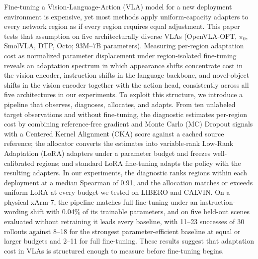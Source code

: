 Fine-tuning a Vision-Language-Action (VLA) model for a new deployment environment is expensive, yet most methods apply uniform-capacity adapters to every network region as if every region requires equal adjustment. This paper tests that assumption on five architecturally diverse VLAs (OpenVLA-OFT, $\pi_0$, SmolVLA, DTP, Octo; 93M--7B parameters). Measuring per-region adaptation cost as normalized parameter displacement under region-isolated fine-tuning reveals an adaptation spectrum in which appearance shifts concentrate cost in the vision encoder, instruction shifts in the language backbone, and novel-object shifts in the vision encoder together with the action head, consistently across all five architectures in our experiments. To exploit this structure, we introduce a pipeline that observes, diagnoses, allocates, and adapts. From ten unlabeled target observations and without fine-tuning, the diagnostic estimates per-region cost by combining reference-free gradient and Monte Carlo (MC) Dropout signals with a Centered Kernel Alignment (CKA) score against a cached source reference; the allocator converts the estimates into variable-rank Low-Rank Adaptation (LoRA) adapters under a parameter budget and freezes well-calibrated regions; and standard LoRA fine-tuning adapts the policy with the resulting adapters. In our experiments, the diagnostic ranks regions within each deployment at a median Spearman of 0.91, and the allocation matches or exceeds uniform LoRA at every budget we tested on LIBERO and CALVIN. On a physical xArm-7, the pipeline matches full fine-tuning under an instruction-wording shift with 0.04\% of its trainable parameters, and on five held-out scenes evaluated without retraining it leads every baseline, with 11--23 successes of 30 rollouts against 8--18 for the strongest parameter-efficient baseline at equal or larger budgets and 2--11 for full fine-tuning. These results suggest that adaptation cost in VLAs is structured enough to measure before fine-tuning begins.
